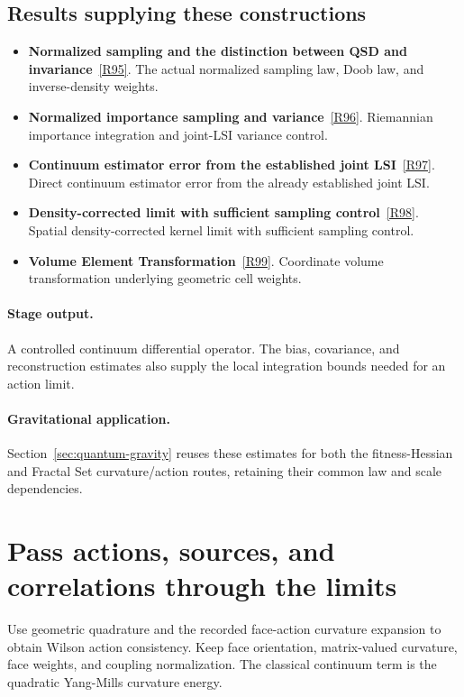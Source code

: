 \documentclass[11pt,a4paper]{article}
\begin{document}
\subsection*{Results supplying these constructions}
\begin{itemize}
\item \textbf{Normalized sampling and the distinction between QSD and invariance}~\hyperref[src:lem-continuum-a3-qsd-sampling]{[R95]}. The actual normalized sampling law, Doob law, and inverse-density weights.
\item \textbf{Normalized importance sampling and variance}~\hyperref[src:prop-monte-carlo-riemannian-latent]{[R96]}. Riemannian importance integration and joint-LSI variance control.
\item \textbf{Continuum estimator error from the established joint LSI}~\hyperref[src:cor-cst-inherited-lsi-consistency]{[R97]}. Direct continuum estimator error from the already established joint LSI.
\item \textbf{Density-corrected limit with sufficient sampling control}~\hyperref[src:prop-density-corrected-limit]{[R98]}. Spatial density-corrected kernel limit with sufficient sampling control.
\item \textbf{Volume Element Transformation}~\hyperref[src:thm-volume-element-transformation]{[R99]}. Coordinate volume transformation underlying geometric cell weights.
\end{itemize}
\paragraph{Stage output.} A controlled continuum differential operator. The bias, covariance, and reconstruction estimates also supply the local integration bounds needed for an action limit.
\paragraph{Gravitational application.} Section~\ref{sec:quantum-gravity} reuses these estimates for both the fitness-Hessian and Fractal Set curvature/action routes, retaining their common law and scale dependencies.

\section{Pass actions, sources, and correlations through the limits}
\label{stage:16}
Use geometric quadrature and the recorded face-action curvature expansion to obtain Wilson action consistency. Keep face orientation, matrix-valued curvature, face weights, and coupling normalization. The classical continuum term is the quadratic Yang-Mills curvature energy.
\end{document}

